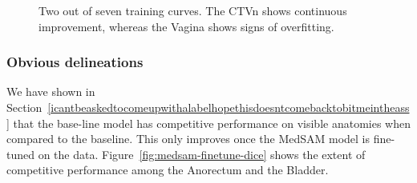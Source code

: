 \documentclass[12pt,twoside]{report}
\begin{document}
\begin{figure}[H]
  \centering
  \caption{Two out of seven training curves. The CTVn shows continuous improvement, whereas the Vagina shows signs of overfitting.}\label{fig:medsam-training-curves}
\end{figure}

\subsubsection{Obvious delineations}

We have shown in Section~\ref{icantbeaskedtocomeupwithalabelhopethisdoesntcomebacktobitmeintheass} that the base-line model has competitive performance on visible anatomies when compared to the baseline. This only improves once the MedSAM model is fine-tuned on the data. Figure~\ref{fig:medsam-finetune-dice} shows the extent of competitive performance among the Anorectum and the Bladder.
\end{document}
